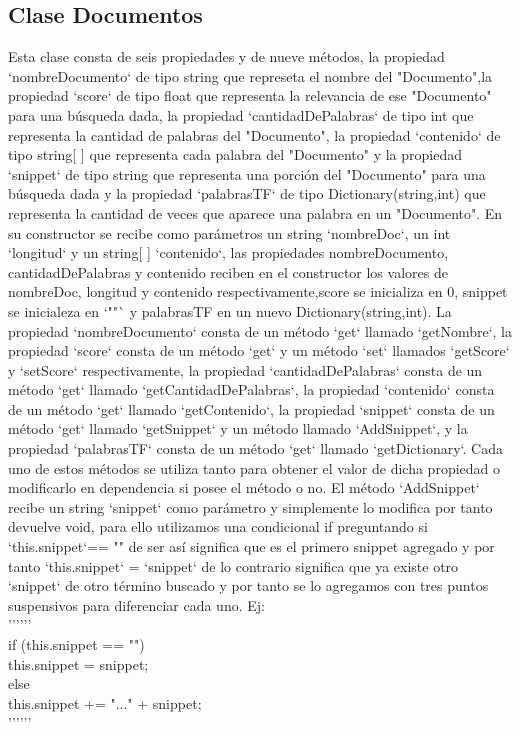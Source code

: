 \documentclass{article}
\begin{document}
\subsection{Clase Documentos}
Esta clase consta de seis propiedades y de nueve métodos, la propiedad `nombreDocumento` de tipo string que represeta el nombre del "Documento",la propiedad `score` de tipo float que representa la relevancia de ese "Documento" para una búsqueda dada, la propiedad `cantidadDePalabras` de tipo int que representa la cantidad de palabras del "Documento", la propiedad `contenido` de tipo string[ ] que representa cada palabra del "Documento" y la propiedad `snippet` de tipo string que representa una porción del "Documento" para una búsqueda dada y la propiedad `palabrasTF` de tipo Dictionary(string,int) que representa la cantidad de veces que aparece una palabra en un "Documento". En su constructor se recibe como parámetros un string `nombreDoc`, un int `longitud` y un string[ ] `contenido`, las propiedades nombreDocumento, cantidadDePalabras y contenido reciben en el constructor los valores de nombreDoc, longitud y contenido respectivamente,score se inicializa en 0, snippet se inicialeza en `""` y palabrasTF en un nuevo Dictionary(string,int).
La propiedad `nombreDocumento` consta de un método `get` llamado `getNombre`, la propiedad `score` consta de un método `get` y un método `set` llamados `getScore` y `setScore` respectivamente, la propiedad `cantidadDePalabras` consta de un método `get` llamado `getCantidadDePalabras`, la propiedad `contenido` consta de un método `get` llamado `getContenido`, la propiedad `snippet` consta de un método `get` llamado `getSnippet` y un método llamado `AddSnippet`, y la propiedad `palabrasTF` consta de un método `get` llamado `getDictionary`. Cada uno de estos métodos se utiliza tanto para obtener el valor de dicha propiedad o modificarlo en dependencia si posee el método o no.
El método `AddSnippet` recibe un string `snippet` como parámetro y simplemente lo modifica por tanto devuelve void, para ello utilizamos una condicional if preguntando si `this.snippet`== "" de ser así significa que es el primero snippet agregado y por tanto `this.snippet` = `snippet` de lo contrario significa que ya existe otro `snippet` de otro término buscado y por tanto se lo agregamos con tres puntos suspensivos para diferenciar cada uno.
Ej:\\
''''''\\
if (this.snippet == "")\\
this.snippet = snippet;\\
else\\
this.snippet += "..." + snippet;\\
''''''
\end{document}
